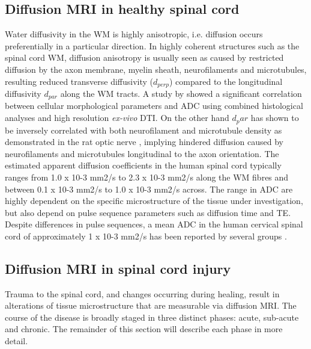 \subsection{Diffusion MRI in healthy spinal cord}
Water diffusivity in the \gls{WM} is highly anisotropic, i.e. diffusion occurs preferentially in a particular direction. In highly coherent structures such as the spinal cord WM, diffusion anisotropy is usually seen as caused by restricted diffusion by the axon membrane, myelin sheath, neurofilaments and microtubules, resulting reduced transverse diffusivity ($d_{perp}$) compared to the longitudinal diffusivity $d_{par}$ along the \gls{WM} tracts. A study by \citet{Schwartz:XX} showed a significant correlation between cellular morphological parameters and \gls{ADC} using combined histological analyses and high resolution \emph{ex-vivo} \gls{DTI}. On the other hand $d_par$ has shown to be inversely correlated with both neurofilament and microtubule density as demonstrated in the rat optic nerve \citep{199}, implying hindered diffusion caused by neurofilaments and microtubules longitudinal to the axon orientation. 
%
%
%
%
 The estimated apparent diffusion coefficients in the human spinal cord typically ranges from 1.0 x 10-3 mm2/s to 2.3 x 10-3 mm2/s along the \gls{WM} fibres and between 0.1 x 10-3 mm2/s to 1.0 x 10-3 mm2/s across. The range in \gls{ADC} are highly dependent on the specific microstructure of the tissue under investigation, but also depend on pulse sequence parameters such as diffusion time and \gls{TE}. Despite differences in pulse sequences, a mean \gls{ADC} in the human cervical spinal cord of approximately 1 x 10-3 mm2/s has been reported by several groups \citep{200, 201}.

\subsection{Diffusion MRI in spinal cord injury}
Trauma to the spinal cord, and changes occurring during healing, result in alterations of tissue microstructure that are measurable via diffusion MRI.  The course of the disease is broadly staged in three distinct phases: acute, sub-acute and chronic. The remainder of this section will describe each phase in more detail.  

